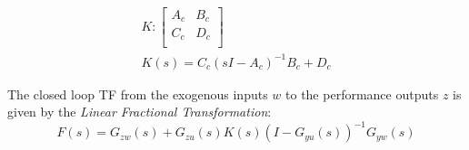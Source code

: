 \begin{gather*}
    K : \left[
        \begin{array}{c|c} %
            A_c & B_c \\
            \hline %
            C_c & D_c \\
        \end{array}
        \right]                            \\
    K(s) = {C_c(sI-A_c)}^{-1}B_c+D_c
\end{gather*}

The closed loop TF from the exogenous inputs $w$ to the performance outputs $z$ is given by the \textit{Linear Fractional Transformation}:
\begin{equation*}
    F(s) = G_{zw}(s) + G_{zu}(s)K(s){(I-G_{yu}(s))}^{-1}G_{yw}(s)
\end{equation*}

